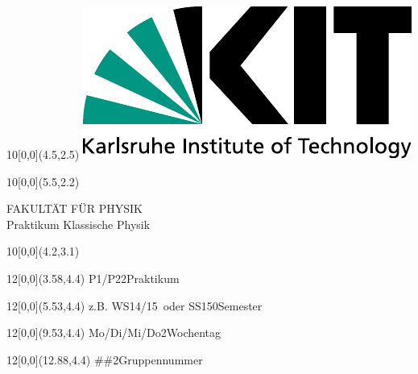 \newcommand{\diameter}{20}
\newcommand{\xone}{-15}
\newcommand{\xtwo}{160}
\newcommand{\yone}{15}
\newcommand{\ytwo}{-253}

\newcommand{\hoehea}{60}
\newcommand{\hoeheb}{60}




\begin{titlepage}

    \begin{textblock}{10}[0,0](4.5,2.5)
        \includegraphics[width=.25\textwidth]{../praktikum-protokollvorlage-latex/include/kitlogo.pdf}
    \end{textblock}
    \begin{textblock}{10}[0,0](5.5,2.2)
        \begin{flushright}
            \Large FAKULTÄT FÜR PHYSIK\\Praktikum Klassische Physik
        \end{flushright}
    \end{textblock}

    \begin{textblock}{10}[0,0](4.2,3.1)
    \end{textblock}

    \Large
    \begin{textblock}{12}[0,0](3.58,4.4)
                    {P1/P2}{2}{Praktikum}
    \end{textblock}
    \begin{textblock}{12}[0,0](5.53,4.4)
        {z.B. \glqq WS14/15\grqq\ oder \glqq SS15\grqq}{0}{Semester}
    \end{textblock}
    \begin{textblock}{12}[0,0](9.53,4.4)
                    {Mo/Di/Mi/Do}{2}{Wochentag}
    \end{textblock}
    \begin{textblock}{12}[0,0](12.88,4.4)
                   {\#\#}{2}{Gruppennummer}
    \end{textblock}


\end{titlepage}
